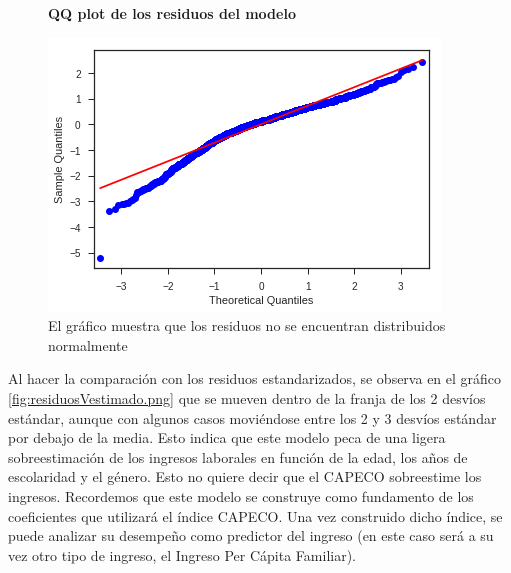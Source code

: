     \begin{figure}[!htb]
    	\centering
    	\textbf{QQ plot de los residuos del modelo}\par\medskip
    	\includegraphics[scale = 0.4]{../img/capitulo3/residuosNormales.png}
    	\caption{El gráfico muestra que los residuos no se encuentran distribuidos normalmente}
    	\label{fig:residuosNormales.png}
    \end{figure}

Al hacer la comparación con los residuos estandarizados, se observa en el gráfico \ref{fig:residuosVestimado.png} que se mueven dentro de la franja de los 2 desvíos estándar, aunque con algunos casos moviéndose entre los 2 y 3 desvíos estándar por debajo de la media. Esto indica que este modelo peca de una ligera sobreestimación de los ingresos laborales en función de la edad, los años de escolaridad y el género. Esto no quiere decir que el CAPECO sobreestime los ingresos. Recordemos que este modelo se construye como fundamento de los coeficientes que utilizará el índice CAPECO. Una vez construido dicho índice, se puede analizar su desempeño como predictor del ingreso (en este caso será a su vez otro tipo de ingreso, el Ingreso Per Cápita Familiar).

